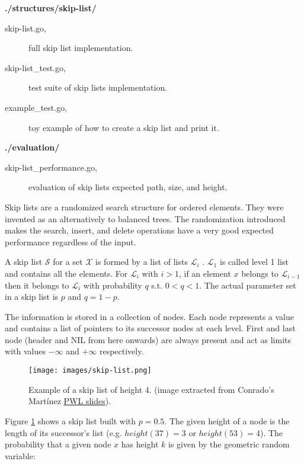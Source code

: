 \documentclass[a4paper,10pt,table,xcdraw]{article}
\begin{document}
\textbf{./structures/skip-list/}
\begin{description}
\item [\hspace{10mm} skip-list.go,] full skip list implementation.
\item [\hspace{10mm} skip-list\_test.go,] test suite of skip lists implementation.
\item [\hspace{10mm} example\_test.go,] toy example of how to create a skip list and print it.
\end{description}
\textbf{./evaluation/}
\begin{description}
\item [\hspace{10mm} skip-list\_performance.go,] evaluation of skip lists expected path, size, and height.
\end{description}

Skip lists \cite{Pugh1990} are a randomized search structure for ordered elements. They were invented as an alternatively to balanced trees. The randomization introduced makes the search, insert, and delete operations have a very good expected performance regardless of the input.

A skip list $\mathcal{S}$ for a set $\mathcal{X}$ is formed by a list of lists $\mathcal{L}_i$ . $\mathcal{L}_1$ is called level 1 list and contains all the elements. For $\mathcal{L}_i$ with $i > 1$, if an element $x$ belongs to  $\mathcal{L}_{i-1}$ then it belongs to $\mathcal{L}_i$ with probability $q$ s.t. $0 < q < 1$. The actual parameter set in a skip list is $p$ and $q = 1 - p$.

The information is stored in a collection of nodes. Each node represents a value and contains a list of pointers to its successor nodes at each level. First and last node (header and NIL from here onwards) are always present and act as limits with values $- \infty$ and $+ \infty$ respectively.

\begin{figure}[h]
\centering
\texttt{[image: images/skip-list.png]}
\caption{Example of a skip list of height 4. (image extracted from  Conrado's Martínez \href{https://drive.google.com/file/d/0B2Eb2dCEJBHQNHNGcDhLNjAwZ3Bnck1tU3JaR1lRcHM1U1pv/view}{PWL slides}).}
\label{fig:skip-list}
\end{figure}

Figure \ref{fig:skip-list} shows a skip list built with $p=0.5$. The given height of a node is the length of its successor's list (e.g. $height(37) = 3$ or $height(53)=4$). The probability that a given node $x$ has height $k$ is given by the geometric random variable:
\end{document}
